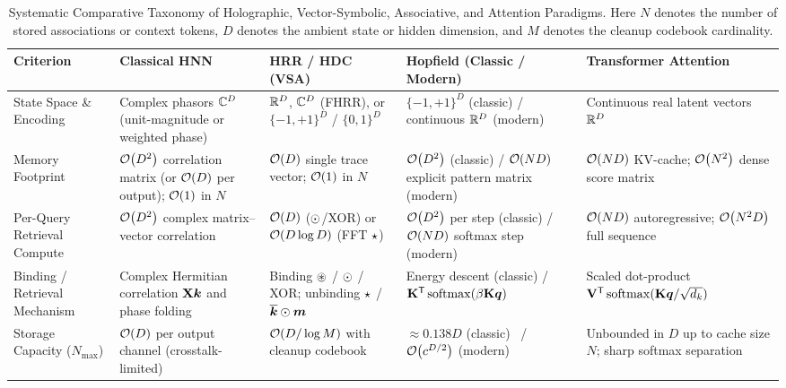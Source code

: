 \begin{table}[htbp]
\centering
\caption{Systematic Comparative Taxonomy of Holographic, Vector-Symbolic, Associative, and Attention Paradigms. Here $N$ denotes the number of stored associations or context tokens, $D$ denotes the ambient state or hidden dimension, and $M$ denotes the cleanup codebook cardinality.}
\label{tab:paradigm_comparison}
\scriptsize
\setlength{\tabcolsep}{4pt}
\renewcommand{\arraystretch}{1.24}
\begin{tabularx}{\textwidth}{@{} >{\raggedright\arraybackslash}p{2.35cm} >{\raggedright\arraybackslash}X >{\raggedright\arraybackslash}X >{\raggedright\arraybackslash}X >{\raggedright\arraybackslash}X @{}}
\toprule
\textbf{Criterion} & \textbf{Classical HNN}~\cite{SUTHERLAND_1990_HNN} & \textbf{HRR / HDC (VSA)}~\cite{PLATE_1995_HRR,KANERVA_2009_HDC} & \textbf{Hopfield (Classic / Modern)}~\cite{HOPFIELD_1982_ASSOCIATIVE,RAMSAUER_MODERN_HOPFIELD} & \textbf{Transformer Attention}~\cite{VASWANI_TRANSFORMER} \\
\midrule
State Space \& Encoding & Complex phasors $\mathbb{C}^D$ (unit-magnitude or weighted phase) & $\mathbb{R}^D$, $\mathbb{C}^D$ (FHRR), or $\{-1,+1\}^D$ / $\{0,1\}^D$ & $\{-1,+1\}^D$ (classic) / continuous $\mathbb{R}^D$ (modern) & Continuous real latent vectors $\mathbb{R}^D$ \\
\addlinespace[2pt]
Memory Footprint & $\mathcal{O}\!\left(D^2\right)$ correlation matrix (or $\mathcal{O}\!\left(D\right)$ per output); $\mathcal{O}\!\left(1\right)$ in $N$ & $\mathcal{O}\!\left(D\right)$ single trace vector; $\mathcal{O}\!\left(1\right)$ in $N$ & $\mathcal{O}\!\left(D^2\right)$ (classic) / $\mathcal{O}\!\left(ND\right)$ explicit pattern matrix (modern) & $\mathcal{O}\!\left(ND\right)$ KV-cache; $\mathcal{O}\!\left(N^2\right)$ dense score matrix \\
\addlinespace[2pt]
Per-Query Retrieval Compute & $\mathcal{O}\!\left(D^2\right)$ complex matrix--vector correlation & $\mathcal{O}\!\left(D\right)$ ($\odot$/XOR) or $\mathcal{O}\!\left(D\log D\right)$ (FFT $\star$) & $\mathcal{O}\!\left(D^2\right)$ per step (classic) / $\mathcal{O}\!\left(ND\right)$ softmax step (modern) & $\mathcal{O}\!\left(ND\right)$ autoregressive; $\mathcal{O}\!\left(N^2 D\right)$ full sequence \\
\addlinespace[2pt]
Binding / Retrieval Mechanism & Complex Hermitian correlation $\mathbf{X}\boldsymbol{k}$ and phase folding & Binding $\circledast$ / $\odot$ / XOR; unbinding $\star$ / $\overline{\boldsymbol{k}}\odot\boldsymbol{m}$ & Energy descent (classic) / $\mathbf{K}^{\mathsf{T}}\operatorname{softmax}(\beta\mathbf{K}\boldsymbol{q})$ & Scaled dot-product $\mathbf{V}^{\mathsf{T}}\operatorname{softmax}(\mathbf{K}\boldsymbol{q}/\sqrt{d_k})$ \\
\addlinespace[2pt]
Storage Capacity ($N_{\max}$) & $\mathcal{O}\!\left(D\right)$ per output channel (crosstalk-limited) & $\mathcal{O}\!\left(D / \log M\right)$ with cleanup codebook~\cite{FRADY_CAPACITY_VSA} & $\approx 0.138D$ (classic)~\cite{AMIT_1985_HOPFIELD_CAPACITY} / $\mathcal{O}\!\left(c^{D/2}\right)$ (modern) & Unbounded in $D$ up to cache size $N$; sharp softmax separation \\

\end{tabularx}
\end{table}
